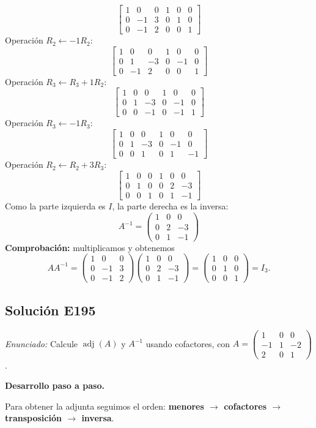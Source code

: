 \documentclass[12pt]{article}
\theoremstyle{remark}
\newcommand{\adj}{\operatorname{adj}}
\newcommand{\solucion}[2]{\Needspace{11\baselineskip}\subsection*{Solución E#1}\noindent\textit{Enunciado:} #2\par\medskip\noindent\textbf{Desarrollo paso a paso.}\par\medskip}
\begin{document}
\[
\left[\begin{array}{rrr|rrr}1&0&0&1&0&0\\0&-1&3&0&1&0\\0&-1&2&0&0&1\end{array}\right]
\]
Operación $R_{2}\leftarrow -1R_{2}$:
\[
\left[\begin{array}{rrr|rrr}1&0&0&1&0&0\\0&1&-3&0&-1&0\\0&-1&2&0&0&1\end{array}\right]
\]
Operación $R_{3}\leftarrow R_{3}+1R_{2}$:
\[
\left[\begin{array}{rrr|rrr}1&0&0&1&0&0\\0&1&-3&0&-1&0\\0&0&-1&0&-1&1\end{array}\right]
\]
Operación $R_{3}\leftarrow -1R_{3}$:
\[
\left[\begin{array}{rrr|rrr}1&0&0&1&0&0\\0&1&-3&0&-1&0\\0&0&1&0&1&-1\end{array}\right]
\]
Operación $R_{2}\leftarrow R_{2}+3R_{3}$:
\[
\left[\begin{array}{rrr|rrr}1&0&0&1&0&0\\0&1&0&0&2&-3\\0&0&1&0&1&-1\end{array}\right]
\]
Como la parte izquierda es $I$, la parte derecha es la inversa:
\[
\boxed{A^{-1}=\begin{pmatrix}1&0&0\\0&2&-3\\0&1&-1\end{pmatrix}}
\]
\textbf{Comprobación:} multiplicamos y obtenemos
\[
AA^{-1}=\begin{pmatrix}1&0&0\\0&-1&3\\0&-1&2\end{pmatrix}\begin{pmatrix}1&0&0\\0&2&-3\\0&1&-1\end{pmatrix}=\begin{pmatrix}1&0&0\\0&1&0\\0&0&1\end{pmatrix}=I_{3}.
\]

\medskip

\solucion{195}{Calcule $\adj(A)$ y $A^{-1}$ usando cofactores, con $A=\begin{pmatrix}1&0&0\\-1&1&-2\\2&0&1\end{pmatrix}$.}
Para obtener la adjunta seguimos el orden: \textbf{menores $\to$ cofactores $\to$ transposición $\to$ inversa}.
\end{document}
